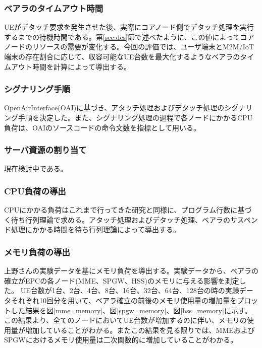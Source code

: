 \documentclass[a4j]{ujarticle}
\begin{document}
\subsubsection{ベアラのタイムアウト時間}
UEがデタッチ要求を発生させた後、実際にコアノード側でデタッチ処理を実行するまでの待機時間である。第\ref{sec:des}節で述べたように、この値によってコアノードのリソースの需要が変化する。今回の評価では、ユーザ端末とM2M/IoT端末の存在割合に応じて、収容可能なUE台数を最大化するようなベアラのタイムアウト時間を計算によって導出する。


\subsubsection{シグナリング手順}
OpenAirInterface(OAI)\cite{OpenAirInterface}に基づき、アタッチ処理およびデタッチ処理のシグナリング手順を決定した。また、シグナリング処理の過程で各ノードにかかるCPU負荷は、OAIのソースコードの命令文数を指標として用いる。
\subsubsection{サーバ資源の割り当て}
現在検討中である。

\subsubsection{CPU負荷の導出}
\label{sec:cpu}
CPUにかかる負荷はこれまで行ってきた研究と同様に、プログラム行数に基づく待ち行列理論で求める。アタッチ処理およびデタッチ処理、ベアラのサスペンド処理にかかる時間を待ち行列理論によって導出する。

\subsubsection{メモリ負荷の導出}
\label{sec:memory}
上野さんの実験データを基にメモリ負荷を導出する。実験データから、ベアラの確立がEPCの各ノード(MME、SPGW、HSS)のメモリに与える影響を測定した。
UE台数が1台、2台、4台、8台、16台、32台、64台、128台の時の実験データそれぞれ10回分を用いて、ベアラ確立の前後のメモリ使用量の増加量をプロットした結果を図\ref{mme_memory}、図\ref{spgw_memory}、図\ref{hss_memory}に示す。
この結果より、全てのノードにおいてUE台数が増加するのに伴い、メモリの使用量が増加していることがわかる。またこの結果を見る限りでは、MMEおよびSPGWにおけるメモリ使用量は二次関数的に増加していることがわかる。
\end{document}
